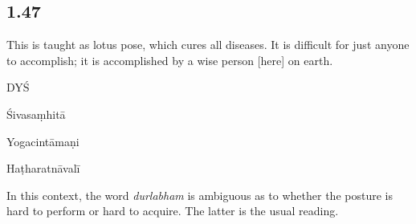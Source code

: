 \begin{ekdosis}
\subsection*{1.47}
\begin{translation}[hp01_047]
This is taught as lotus pose, which cures all diseases. It is difficult for just anyone to accomplish; it is accomplished by a wise person [here] on earth.
\end{translation}

\begin{sources}[hp01_047]
DYŚ

\begin{versinnote}
\end{versinnote}

Śivasaṃhitā

\begin{versinnote}
\end{versinnote}

\end{sources}

\begin{testimonia}[hp01_047]
Yogacintāmaṇi

\begin{versinnote}
\end{versinnote}

Haṭharatnāvalī

\begin{versinnote}
\end{versinnote}

\end{testimonia}

\begin{philcomm}[hp01_047]
In this context, the word \emph{durlabham} is ambiguous as to whether the posture is hard to perform or hard to acquire. The latter is the usual reading.
\end{philcomm}


\end{ekdosis}

